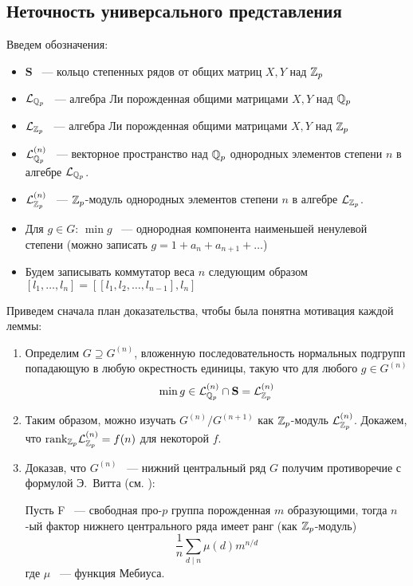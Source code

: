 \subsection{Неточность универсального представления}\label{subsec:zubkov-non-injective}
Введем обозначения:
\begin{itemize}
    \item $\mathbf{S}$ ~--- кольцо степенных рядов от общих матриц $X, Y$ над $\mathbb{Z}_p$
    \item $\mathcal{L}_{\mathbb{Q}_p}$ ~--- алгебра Ли порожденная общими матрицами $X, Y$ над $\mathbb{Q}_p$
    \item $\mathcal{L}_{\mathbb{Z}_p}$ ~--- алгебра Ли порожденная общими матрицами $X, Y$ над $\mathbb{Z}_p$
    \item $\mathcal{L}_{\mathbb{Q}_p}^{(n)}$ ~--- векторное пространство над $\mathbb{Q}_p$ однородных элементов степени $n$ в алгебре $\mathcal{L}_{\mathbb{Q}_p}$.
    \item $\mathcal{L}_{\mathbb{Z}_p}^{(n)}$ ~---  $\mathbb{Z}_p$-модуль однородных элементов степени $n$ в алгебре $\mathcal{L}_{\mathbb{Z}_p}$.
    \item Для $g\in G$: $\min{g}$ ~--- однородная компонента наименьшей ненулевой степени (можно записать $g=1 + a_n + a_{n+1} + \ldots$)
    \item Будем записывать коммутатор веса $n$ следующим образом $[l_1, \ldots, l_n] = [[l_1, l_2, \ldots, l_{n-1}], l_n]$
\end{itemize}
Приведем сначала план доказательства, чтобы была понятна мотивация каждой леммы:
\begin{enumerate}
    \item Определим $G\supseteq G^{(n)}$, вложенную последовательность нормальных подгрупп попадающую в любую окрестность единицы, такую что для любого $g\in G^{(n)}$
    \[
        \min{g} \in \mathcal{L}^{(n)}_{\mathbb{Q}_p}\cap\mathbf{S} = \mathcal{L}^{(n)}_{\mathbb{Z}_p}
    \]
    \item Таким образом, можно изучать $G^{(n)}/G^{(n+1)}$ как $\mathbb{Z}_p$-модуль $\mathcal{L}^{(n)}_{\mathbb{Z}_p}$.
    Докажем, что $\mathrm{rank}_{\mathbb{Z}_p}{\mathcal{L}^{(n)}_{\mathbb{Z}_p}} = f(n)$ для некоторой $f$.
    \item Доказав, что $G^{(n)}$ ~--- нижний центральный ряд $G$ получим противоречие с формулой Э.\ Витта (см. \cite{Lubotzky}):~\begin{proposition}
                                                                                                                                      \label{thm:Vitt}
                                                                                                                                      Пусть F ~--- свободная про-$p$ группа порожденная $m$ образующими, тогда $n$-ый фактор нижнего центрального ряда имеет ранг (как $\mathbb{Z}_p$-модуль)
                                                                                                                                      \[
                                                                                                                                          \frac{1}{n}\sum\limits_{d\mid n} \mu(d) m^{n / d}
                                                                                                                                      \]
                                                                                                                                      где $\mu$ ~--- функция Мебиуса.
    \end{proposition}
\end{enumerate}
